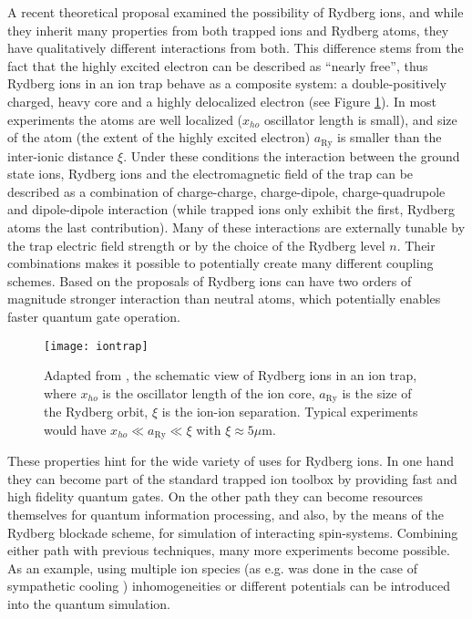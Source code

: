 A recent theoretical proposal \cite{Mueller2008} examined the possibility of Rydberg ions, and while they inherit many properties from both trapped ions and Rydberg atoms, they have qualitatively different interactions from both. This difference stems from the fact that the highly excited electron can be described as ``nearly free'', thus Rydberg ions in an ion trap behave as a composite system: a double-positively charged, heavy core and a highly delocalized electron (see Figure \ref{fig:iontrap}). In most experiments the atoms are well localized ($x_{ho}$ oscillator length is small), and size of the atom (the extent of the highly excited electron) $a_\mathrm{Ry}$ is smaller than the inter-ionic distance $\xi$. Under these conditions the interaction between the ground state ions, Rydberg ions and the electromagnetic field of the trap can be described as a combination of charge-charge, charge-dipole, charge-quadrupole and dipole-dipole interaction (while trapped ions only exhibit the first, Rydberg atoms the last contribution). Many of these interactions are externally tunable by the trap electric field strength or by the choice of the Rydberg level $n$. Their combinations makes it possible to potentially create many different coupling schemes. Based on the proposals of \cite{Mueller2008} Rydberg ions can have two orders of magnitude stronger interaction than neutral atoms, which potentially enables faster quantum gate operation.

\begin{figure}
  \begin{center}
    \texttt{[image: iontrap]}
    \caption{Adapted from \cite{Mueller2008}, the schematic view of Rydberg ions in an ion trap, where $x_{ho}$ is the oscillator length of the ion core, $a_\mathrm{Ry}$ is the size of the Rydberg orbit, $\xi$ is the ion-ion separation. Typical experiments would have $x_{ho} \ll a_\mathrm{Ry} \ll \xi$ with $\xi \approx 5 \mu\mathrm{m}$.}
  \end{center}
  \label{fig:iontrap}
\end{figure}

These properties hint for the wide variety of uses for Rydberg ions. In one hand they can become part of the standard trapped ion toolbox by providing fast and high fidelity quantum gates. On the other path they can become resources themselves for quantum information processing, and also, by the means of the Rydberg blockade scheme, for simulation of interacting spin-systems. Combining either path with previous techniques, many more experiments become possible. As an example, using multiple ion species (as e.g. was done in the case of sympathetic cooling \cite{Home2009}) inhomogeneities or different potentials can be introduced into the quantum simulation.

